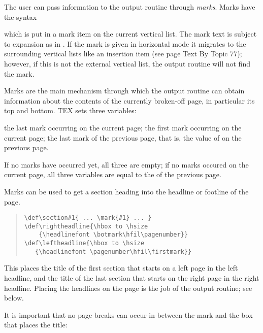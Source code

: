 The user can pass information to the output routine through \textit{marks}. Marks have the syntax

\begin{teX}
\end{teX}

which is put in a mark item on the current vertical list. The mark text is subject to expansion
as in .
If the mark is given in horizontal mode it migrates to the surrounding vertical lists like an
insertion item (see page Text By Topic 77); however, if this is not the external vertical list, the output routine
will not find the mark.

Marks are the main mechanism through which the output routine can obtain information
about the contents of the currently broken-off page, in particular its top and bottom. TEX sets
three variables:

{\obeylines
{} the last mark occurring on the current page;
 the first mark occurring on the current page;
 the last mark of the previous page, that is, the value of  on the previous
page.
}



If no marks have occurred yet, all three are empty; if no marks occured on the current page, all three variables are equal to the  of the previous page. 

Marks can be used to get a section heading into the headline or footline of the page.

\begin{quote}
\begin{verbatim}
\def\section#1{ ... \mark{#1} ... }
\def\rightheadline{\hbox to \hsize
    {\headlinefont \botmark\hfil\pagenumber}}
\def\leftheadline{\hbox to \hsize
   {\headlinefont \pagenumber\hfil\firstmark}}
\end{verbatim}
\end{quote}

This places the title of the first section that starts on a left page in the left
headline, and the title of the last section that starts on the right page in
the right headline. Placing the headlines on the page is the job of the output
routine; see below.

It is important that no page breaks can occur in between the mark and the
box that places the title:

